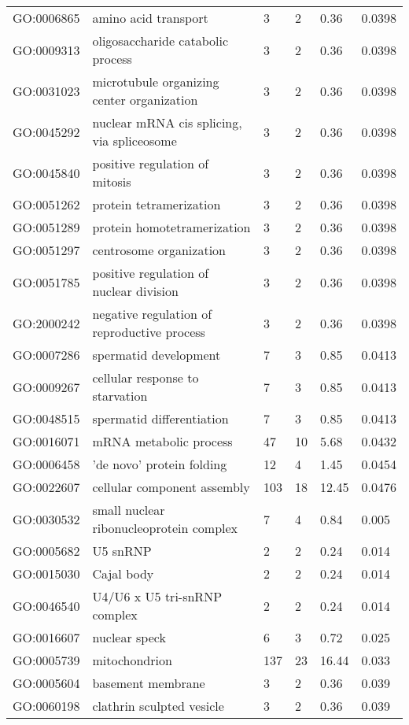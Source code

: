 \documentclass[10pt]{bmc_article}
\newenvironment{bmcformat}{\begin{raggedright}\baselineskip20pt\sloppy\setboolean{publ}{false}}{\end{raggedright}\baselineskip20pt\sloppy}
\begin{document}
\begin{bmcformat}
\begin{longtable}{lp{3cm}llll}
  GO:0006865 & amino acid transport &   3 &   2 & 0.36 & 0.0398 \\ 
  GO:0009313 & oligosaccharide catabolic process &   3 &   2 & 0.36 & 0.0398 \\ 
  GO:0031023 & microtubule organizing center organization &   3 &   2 & 0.36 & 0.0398 \\ 
  GO:0045292 & nuclear mRNA cis splicing, via spliceosome &   3 &   2 & 0.36 & 0.0398 \\ 
  GO:0045840 & positive regulation of mitosis &   3 &   2 & 0.36 & 0.0398 \\ 
  GO:0051262 & protein tetramerization &   3 &   2 & 0.36 & 0.0398 \\ 
  GO:0051289 & protein homotetramerization &   3 &   2 & 0.36 & 0.0398 \\ 
  GO:0051297 & centrosome organization &   3 &   2 & 0.36 & 0.0398 \\ 
  GO:0051785 & positive regulation of nuclear division &   3 &   2 & 0.36 & 0.0398 \\ 
  GO:2000242 & negative regulation of reproductive process &   3 &   2 & 0.36 & 0.0398 \\ 
  GO:0007286 & spermatid development &   7 &   3 & 0.85 & 0.0413 \\ 
  GO:0009267 & cellular response to starvation &   7 &   3 & 0.85 & 0.0413 \\ 
  GO:0048515 & spermatid differentiation &   7 &   3 & 0.85 & 0.0413 \\ 
  GO:0016071 & mRNA metabolic process &  47 &  10 & 5.68 & 0.0432 \\ 
  GO:0006458 & 'de novo' protein folding &  12 &   4 & 1.45 & 0.0454 \\ 
  GO:0022607 & cellular component assembly & 103 &  18 & 12.45 & 0.0476 \\ 
   \hline
GO:0030532 & small nuclear ribonucleoprotein complex &   7 &   4 & 0.84 & 0.005 \\ 
  GO:0005682 & U5 snRNP &   2 &   2 & 0.24 & 0.014 \\ 
  GO:0015030 & Cajal body &   2 &   2 & 0.24 & 0.014 \\ 
  GO:0046540 & U4/U6 x U5 tri-snRNP complex &   2 &   2 & 0.24 & 0.014 \\ 
  GO:0016607 & nuclear speck &   6 &   3 & 0.72 & 0.025 \\ 
  GO:0005739 & mitochondrion & 137 &  23 & 16.44 & 0.033 \\ 
  GO:0005604 & basement membrane &   3 &   2 & 0.36 & 0.039 \\ 
  GO:0060198 & clathrin sculpted vesicle &   3 &   2 & 0.36 & 0.039 \\ 
   \hline
\hline
\end{longtable}

\end{bmcformat}
\end{document}
